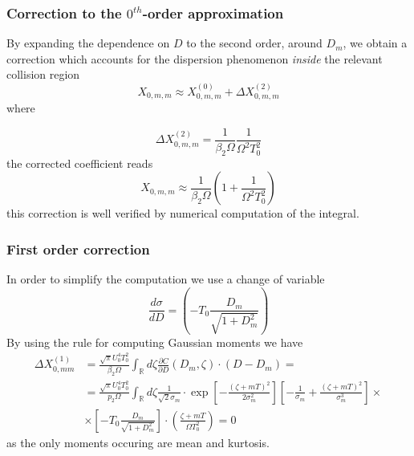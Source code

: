 \documentclass[8pt]{beamer} %
\begin{document}
\begin{frame}
	\frametitle{Correction to the $0^{th}$-order approximation}
	By expanding the dependence on $D$ to the second order, around $D_m$, we obtain a correction which accounts for the dispersion phenomenon \textit{inside} the relevant collision region
	\begin{equation}
		X_{0, m, m} \approx X_{0, m, m}^{(0)} + \Delta X_{0, m, m}^{(2)}
	\end{equation}
	where 

	\begin{equation}\label{eq:correction}
	\Delta X_{0, m, m}^{(2)} = \dfrac{1}{\beta_2 \Omega} \dfrac{1}{\Omega^2 T_0^2}
	\end{equation}
	the corrected coefficient reads
	\begin{equation}
		X_{0, m, m} \approx \dfrac{1}{\beta_2 \Omega} \left(1+\dfrac{1}{\Omega^2 T_0^2}\right)
	\end{equation}
this correction is well verified by numerical computation of the integral.
\end{frame}


\begin{frame}
  \frametitle{First order correction}
  In order to simplify the computation we use a change of variable
  \begin{equation}
    \frac{d \sigma}{d D}=\left(-T_{0} \frac{D_{m}}{\sqrt{1+D_{m}^{2}}}\right)
  \end{equation}
By using the rule for computing Gaussian moments we have
  \begin{align}
    \Delta X_{0, m m}^{(1)} & =\frac{\sqrt{\pi} U_{0}^{4} T_{0}^{2}}{\beta_{2} \Omega} \int_{\mathbb{R}} d \zeta \frac{\partial C}{\partial D}\left(D_{m}, \zeta\right) \cdot\left(D-D_{m}\right)=                                                                                          \\
                            & =\frac{\sqrt{\pi} U_{0}^{4} T_{0}^{2}}{p_{2} \Omega} \int_{\mathbb{R}} d\zeta \frac{1}{\sqrt{2} \sigma_{m}} \cdot \exp \left[-\frac{(\zeta+m T)^{2}}{2 \sigma_{m}^{2}}\right] \left[-\frac{1}{\sigma_{m}}+\frac{(\zeta+m T)^2}{\sigma_{m}^{3}}\right]  \times \\
                            & \times \left[-T_{0} \frac{D_{m}}{\sqrt{1+D_{m}^{2}}}\right] \cdot\left(\frac{\zeta+m T}{\Omega T_{0}^{2}}\right) = 0
  \end{align}
as the only moments occuring are mean and kurtosis.
\end{frame}
\end{document}
